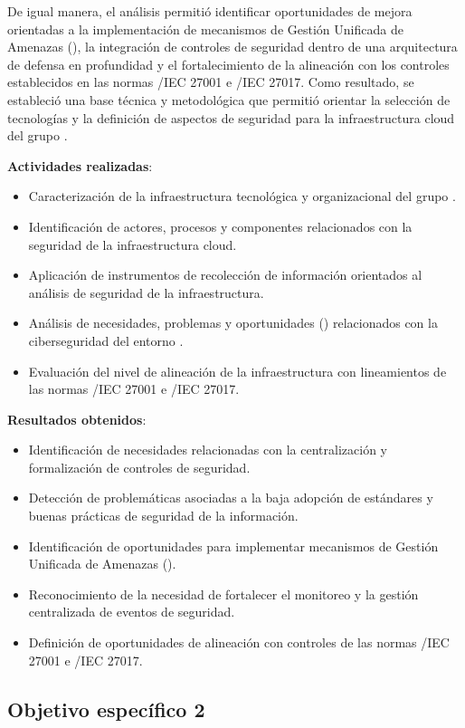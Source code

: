 De igual manera, el análisis permitió identificar oportunidades de mejora orientadas a la implementación de mecanismos de Gestión Unificada 
de Amenazas (\UTM), la integración de controles de seguridad dentro de una arquitectura de defensa en profundidad y el fortalecimiento de la 
alineación con los controles establecidos en las normas \ISO/IEC 27001 e \ISO/IEC 27017. Como resultado, se estableció una base técnica y 
metodológica que permitió orientar la selección de tecnologías y la definición de aspectos de seguridad para la infraestructura cloud del 
grupo \GRID.

\textbf{Actividades realizadas}:
\begin{itemize}
   	\item Caracterización de la infraestructura tecnológica y organizacional del grupo \GRID.
	\item Identificación de actores, procesos y componentes relacionados con la seguridad de la infraestructura cloud.
	\item Aplicación de instrumentos de recolección de información orientados al análisis de seguridad de la infraestructura.
	\item Análisis de necesidades, problemas y oportunidades (\NPO) relacionados con la ciberseguridad del entorno \GRID.
	\item Evaluación del nivel de alineación de la infraestructura con lineamientos de las normas \ISO/IEC 27001 e \ISO/IEC 27017.
\end{itemize}

\textbf{Resultados obtenidos}:
\begin{itemize}
        \item Identificación de necesidades relacionadas con la centralización y formalización de controles de seguridad.
	\item Detección de problemáticas asociadas a la baja adopción de estándares y buenas prácticas de seguridad de la información.
	\item Identificación de oportunidades para implementar mecanismos de Gestión Unificada de Amenazas (\UTM).
	\item Reconocimiento de la necesidad de fortalecer el monitoreo y la gestión centralizada de eventos de seguridad.
	\item Definición de oportunidades de alineación con controles de las normas \ISO/IEC 27001 e \ISO/IEC 27017.
\end{itemize}

\subsection{Objetivo específico 2}
\noindent

